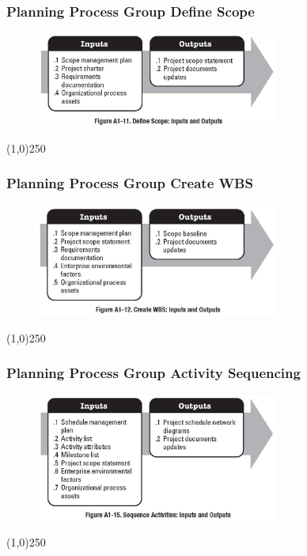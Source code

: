 \begin{frame}
\frametitle{Planning Process Group \hfill Define Scope  }
 \begin{figure}
 	\centering
 		\includegraphics[width = 8cm]{images/FigA1-11.jpg}
 	\label{fig:A1-11}
 \end{figure} 
\end{frame}
\begin{center}\line(1,0){250}\end{center}



\begin{frame}
\frametitle{Planning Process Group \hfill Create WBS}
 \begin{figure}
 	\centering
 		\includegraphics[width = 8cm]{images/FigA1-12.jpg}
 	\label{fig:A1-12}
 \end{figure}
\end{frame}
\begin{center}\line(1,0){250}\end{center}



\begin{frame}
\frametitle{Planning Process Group \hfill Activity Sequencing}
 \begin{figure}
 	\centering
 		\includegraphics[width = 8cm]{images/FigA1-15.jpg}
 	\label{fig:A1-15}
 \end{figure}
\end{frame}
\begin{center}\line(1,0){250}\end{center}



